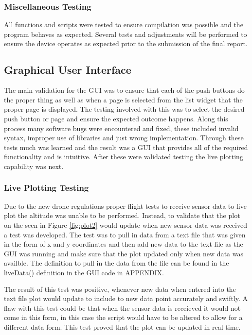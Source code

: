 \subsubsection{Miscellaneous Testing}

All functions and scripts were tested to ensure compilation was possible and the program behaves as expected. Several tests and adjustments will be performed to ensure the device operates as expected prior to the submission of the final report. 



\subsection{Graphical User Interface}
The main validation for the GUI was to ensure that each of the push buttons do the proper thing as well as when a page is selected from the list widget that the proper page is displayed. The testing involved with this was to select the desired push button or page and ensure the expected outcome happens. Along this process many software bugs were encountered and fixed, these included invalid syntax, improper use of libraries and just wrong implementation. Through these tests much was learned and the result was a GUI that provides all of the required functionality and is intuitive. After these were validated testing the live plotting capability was next. 
\subsubsection{Live Plotting Testing}
Due to the new drone regulations proper flight tests to receive sensor data to live plot the altitude was unable to be performed. Instead, to validate that the plot on the seen in Figure \ref{fig:plot2} would update when new sensor data was received a test was developed. The test was to pull in data from a text file that was given in the form of x and y coordinates and then add new data to the text file as the GUI was running and make sure that the plot updated only when new data was availble. The definition to pull in the data from the file can be found in the liveData() definition in the GUI code in APPENDIX.

The result of this test was positive, whenever new data when entered into the text file plot would update to include to new data point accurately and swiftly. A flaw with this test could be that when the sensor data is receieved it would not come in this form, in this case the script would have to be altered to allow for a different data form. This test proved that the plot can be updated in real time.

